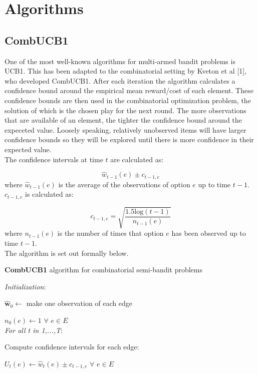 \section{Algorithms}

\subsection{CombUCB1}

One of the most well-known algorithms for multi-armed bandit problems is UCB1. This has been adapted to the combinatorial setting by Kveton et al [1], who developed CombUCB1. After each iteration the algorithm calculates a confidence bound around the empirical mean reward/cost of each element. These confidence bounds are then used in the combinatorial optimization problem, the solution of which is the chosen play for the next round. The more observations that are available of an element, the tighter the confidence bound around the expeceted value. Loosely speaking, relatively unobserved items will have larger confidence bounds so they will be explored until there is more confidence in their expected value.\\

The confidence intervals at time $t$ are calculated as:

$$\hat{w}_{t-1}(e)\pm c_{t-1,e}$$ where $\hat{w}_{t-1}(e)$ is the average of the observations of option $e$ up to time $t-1$. $c_{t-1,e}$ is calculated as:

$$c_{t-1,e}=\sqrt{\frac{1.5\textrm{log}(t-1)}{n_{t-1}(e)}}$$ where $n_{t-1}(e)$ is the number of times that option $e$ has been observed up to time $t-1$.\\

The algorithm is set out formally below.

\noindent \hrulefill

\noindent \textbf{CombUCB1} algorithm for combinatorial semi-bandit problems

\noindent \hrulefill

\noindent \textit{Initialization}:

$\mathbf{\hat{w}}_0 \leftarrow$ make one observation of each edge

$n_0(e) \leftarrow 1$ $\forall$ $e \in E$\\

\noindent \textit{For all t in 1,...,T}:

Compute confidence intervals for each edge:

\indent \indent $U_t(e) \leftarrow \hat{w}_t(e)\pm c_{t-1,e}$ $\forall$ $e \in E$\\

